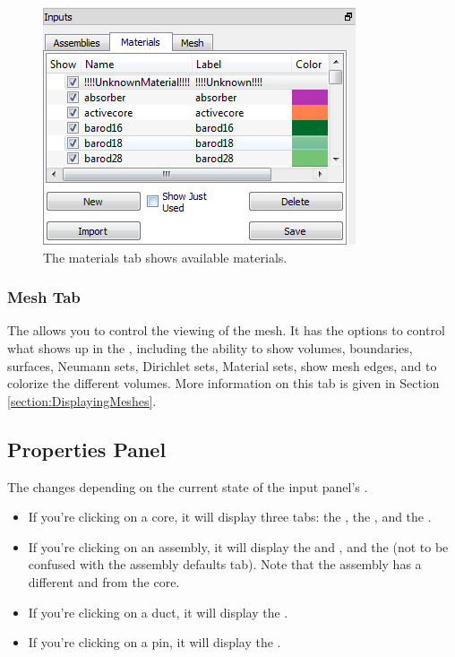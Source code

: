 \begin{figure}[h]
	\begin{center}
		\includegraphics[width=0.5\linewidth]{Images/materials-tab.png}
		\caption{The materials tab shows available materials.}
		\label{fig:mainwindow3}
	\end{center}
\end{figure}

\subsubsection{Mesh Tab}
The  allows you to control the viewing of the mesh.  It has the options to control what shows up in the , including the ability to show volumes, boundaries, surfaces, Neumann sets, Dirichlet sets, Material sets, show mesh edges, and to colorize the different volumes.  More information on this tab is given in Section \ref{section:DisplayingMeshes}.

\subsection{Properties Panel}
The  changes depending on the current state of the input panel's .

\begin{itemize}
	\item{If you're clicking on a core, it will display three tabs: the , the , and the .}
	\item{If you're clicking on an assembly, it will display the  and , and the  (not to be confused with the assembly defaults tab).  Note that the assembly has a different  and  from the core.}
	\item{If you're clicking on a duct, it will display the .}
	\item{If you're clicking on a pin, it will display the .}
\end{itemize}

